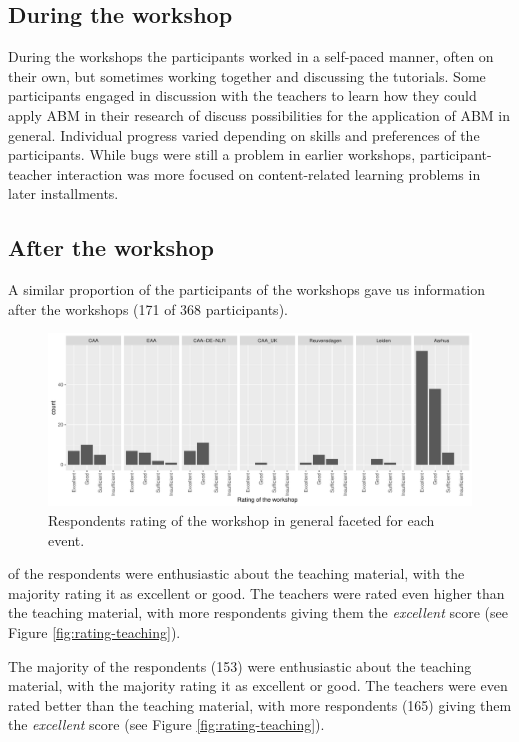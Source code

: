\documentclass[
]{article}
\begin{document}
\hypertarget{during-the-workshop}{%
\subsection{During the workshop}\label{during-the-workshop}}

During the workshops the participants worked in a self-paced manner, often on their own, but sometimes working together and discussing the tutorials. Some participants engaged in discussion with the teachers to learn how they could apply ABM in their research of discuss possibilities for the application of ABM in general. Individual progress varied depending on skills and preferences of the participants. While bugs were still a problem in earlier workshops, participant-teacher interaction was more focused on content-related learning problems in later installments.

\hypertarget{after-the-workshop}{%
\subsection{After the workshop}\label{after-the-workshop}}

A similar proportion of the participants of the workshops gave us information after the workshops (171 of 368 participants).

\begin{figure}
\centering
\includegraphics{paper_files/figure-latex/rating-workshop-1.pdf}
\caption{\label{fig:rating-workshop}Respondents rating of the workshop in general faceted for each event.}
\end{figure}

of the respondents were enthusiastic about the teaching material, with the majority rating it as excellent or good. The teachers were rated even higher than the teaching material, with more respondents giving them the \emph{excellent} score (see Figure \ref{fig:rating-teaching}).

The majority of the respondents (153) were enthusiastic about the teaching material, with the majority rating it as excellent or good. The teachers were even rated better than the teaching material, with more respondents (165) giving them the \emph{excellent} score (see Figure \ref{fig:rating-teaching}).
\end{document}
